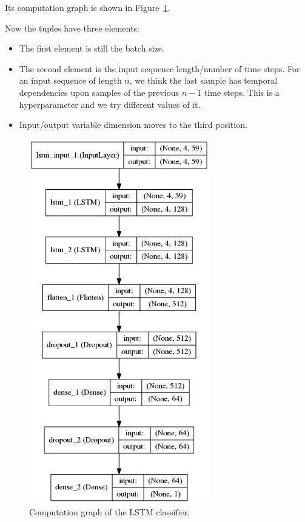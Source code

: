 \documentclass[11pt,a4paper,titlepage]{article}
\begin{document}
Its computation graph is shown in Figure~\ref{fig:lstm}.

Now the tuples have three elements:

\begin{itemize}
  \item The first element is still the batch size.
  \item The second element is the input sequence length/number of time steps.
    For an input sequence of length \(n\), we think the last sample has temporal dependencies upon samples of the previous \(n-1\) time steps.
    This is a hyperparameter and we try different values of it.
  \item Input/output variable dimension moves to the third position.
\end{itemize}

\begin{figure}[htbp]
  \centering
  \includegraphics[width=0.7\textwidth]{model-lstm.png}
  \caption{Computation graph of the LSTM classifier.} \label{fig:lstm}
\end{figure}
\end{document}
